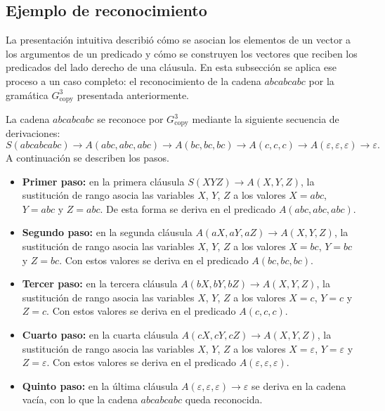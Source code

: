\documentclass{report}
\theoremstyle{definition}
\theoremstyle{plain}
\theoremstyle{remark}
\begin{document}
\subsection{Ejemplo de reconocimiento}

La presentación intuitiva describió cómo se asocian los elementos de
un vector a los argumentos de un predicado y cómo se construyen los
vectores que reciben los predicados del lado derecho de una cláusula.
En esta subsección se aplica ese proceso a un caso completo: el
reconocimiento de la cadena $abcabcabc$ por la gramática
$G_{\mathrm{copy}}^3$ presentada anteriormente.

La cadena $abcabcabc$ se reconoce por $G_{\mathrm{copy}}^3$ mediante
la siguiente secuencia de derivaciones:
\[
  S(abcabcabc) \to A(abc, abc, abc) \to A(bc, bc, bc) \to A(c, c, c)
  \to A(\varepsilon, \varepsilon, \varepsilon) \to \varepsilon.
\]
A continuación se describen los pasos.
\begin{itemize}
  \item \textbf{Primer paso:} en la primera cláusula
    $S(XYZ) \to A(X, Y, Z)$, la sustitución de rango asocia las
    variables $X$, $Y$, $Z$ a los valores $X = abc$, $Y = abc$ y
    $Z = abc$. De esta forma se deriva en el predicado $A(abc, abc,
    abc)$.
  \item \textbf{Segundo paso:} en la segunda cláusula
    $A(aX, aY, aZ) \to A(X, Y, Z)$, la sustitución de rango asocia las
    variables $X$, $Y$, $Z$ a los valores $X = bc$, $Y = bc$ y
    $Z = bc$. Con estos valores se deriva en el predicado
    $A(bc, bc, bc)$.
  \item \textbf{Tercer paso:} en la tercera cláusula
    $A(bX, bY, bZ) \to A(X, Y, Z)$, la sustitución de rango asocia las
    variables $X$, $Y$, $Z$ a los valores $X = c$, $Y = c$ y $Z = c$.
    Con estos valores se deriva en el predicado $A(c, c, c)$.
  \item \textbf{Cuarto paso:} en la cuarta cláusula
    $A(cX, cY, cZ) \to A(X, Y, Z)$, la sustitución de rango asocia las
    variables $X$, $Y$, $Z$ a los valores $X = \varepsilon$,
    $Y = \varepsilon$ y $Z = \varepsilon$. Con estos valores se deriva
    en el predicado $A(\varepsilon, \varepsilon, \varepsilon)$.
  \item \textbf{Quinto paso:} en la última cláusula
    $A(\varepsilon, \varepsilon, \varepsilon) \to \varepsilon$ se deriva
    en la cadena vacía, con lo que la cadena $abcabcabc$ queda
    reconocida.
\end{itemize}
\end{document}
